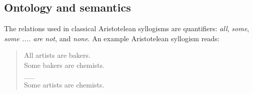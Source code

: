 \documentclass[floatsintext, doc]{apa6}
\newcommand{\mht}[1]{{\textcolor{Blue}{[mht: #1]}}}
\begin{document}
%



\subsection{Ontology and semantics}


The relations used in classical Aristotelean syllogisms are quantifiers: \emph{all}, \emph{some}, \emph{some .... are not}, and \emph{none}.
An example Aristotelean syllogism reads:

\begin{quote}
All artists are bakers. \\
Some bakers are chemists. \\
\_\_ \\
Some artists are chemists.
\end{quote}
\end{document}
